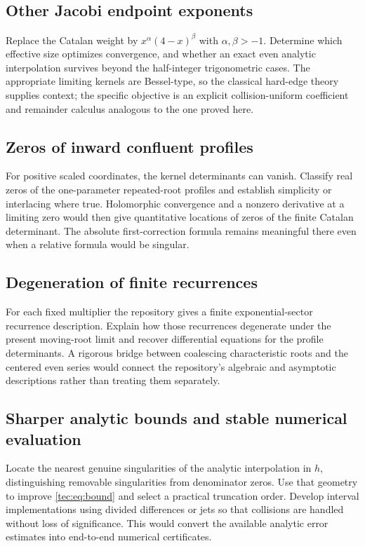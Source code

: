 \documentclass[11pt,a4paper]{article}
\numberwithin{equation}{section}
\theoremstyle{definition}
\theoremstyle{remark}
\begin{document}
\subsection{Other Jacobi endpoint exponents}
Replace the Catalan weight by $x^\alpha(4-x)^\beta$ with
$\alpha,\beta>-1$. Determine which effective size optimizes convergence,
and whether an exact even analytic interpolation survives beyond the
half-integer trigonometric cases. The appropriate limiting kernels are
Bessel-type, so the classical hard-edge theory supplies context; the
specific objective is an explicit collision-uniform coefficient and
remainder calculus analogous to the one proved here.

\subsection{Zeros of inward confluent profiles}
For positive scaled coordinates, the kernel determinants can vanish.
Classify real zeros of the one-parameter repeated-root profiles and
establish simplicity or interlacing where true. Holomorphic convergence
and a nonzero derivative at a limiting zero would then give quantitative
locations of zeros of the finite Catalan determinant. The absolute
first-correction formula remains meaningful there even when a relative
formula would be singular.

\subsection{Degeneration of finite recurrences}
For each fixed multiplier the repository gives a finite exponential-sector
recurrence description. Explain how those recurrences degenerate under
the present moving-root limit and recover differential equations for the
profile determinants. A rigorous bridge between coalescing characteristic
roots and the centered even series would connect the repository's
algebraic and asymptotic descriptions rather than treating them separately.

\subsection{Sharper analytic bounds and stable numerical evaluation}
Locate the nearest genuine singularities of the analytic interpolation
in $h$, distinguishing removable singularities from denominator zeros.
Use that geometry to improve \eqref{tec:eq:bound} and select a practical
truncation order. Develop interval implementations using divided
differences or jets so that collisions are handled without loss of
significance. This would convert the available analytic error estimates
into end-to-end numerical certificates.
\end{document}
